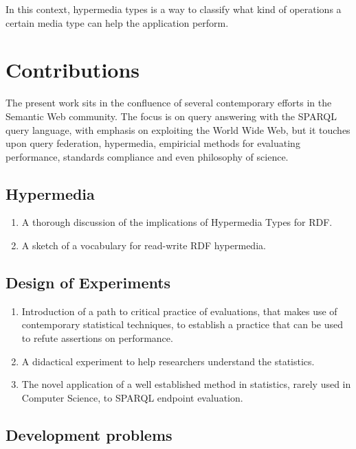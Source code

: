 In this context, hypermedia types is a way to classify what kind of
operations a certain media type can help the application perform.

\section{Contributions}\label{sec:contribsum}

The present work sits in the confluence of several contemporary
efforts in the Semantic Web community. The focus is on query answering
with the SPARQL query language, with emphasis on exploiting the World
Wide Web, but it touches upon query federation, hypermedia, empiricial
methods for evaluating performance, standards compliance and even
philosophy of science. 


\subsection{Hypermedia}

\begin{enumerate}
\item A thorough discussion of the implications of Hypermedia
  Types\cite{hypermediatypes} for RDF.
\item A sketch of a vocabulary for read-write RDF hypermedia.
\end{enumerate}

\subsection{Design of Experiments}

\begin{enumerate}
\item Introduction of a path to critical practice of evaluations, that makes
  use of contemporary statistical techniques, to establish a practice
  that can be used to refute assertions on performance.
\item A didactical experiment to help researchers understand the statistics.
\item The novel application of a well established method in
  statistics, rarely used in Computer Science, to SPARQL endpoint
  evaluation.
  
\end{enumerate}

\subsection{Development problems}

